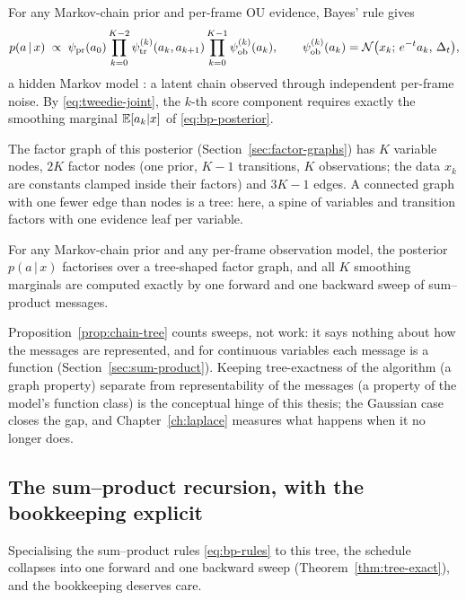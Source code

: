 For any Markov-chain prior and per-frame OU evidence, Bayes' rule gives
\begin{equation}
  p(a \,|\, x) \;\propto\;
  \psi_{\mathrm{pr}}(a_0)
  \prod_{k=0}^{K-2} \psi^{(k)}_{\mathrm{tr}}(a_k, a_{k+1})
  \prod_{k=0}^{K-1} \psi^{(k)}_{\mathrm{ob}}(a_k),
  \qquad
  \psi^{(k)}_{\mathrm{ob}}(a_k) = \mathcal{N}\big(x_k;\, e^{-t}a_k,\, \Delta_t\big),
  \label{eq:bp-posterior}
\end{equation}
a hidden Markov model \citep{rabiner1989tutorial}: a latent chain observed
through independent per-frame noise. By \eqref{eq:tweedie-joint}, the
$k$-th score component requires exactly the smoothing marginal
$\mathbb{E}[a_k | x]$ of \eqref{eq:bp-posterior}.

The factor graph of this posterior (Section~\ref{sec:factor-graphs})
has $K$ variable nodes, $2K$
factor nodes (one prior, $K{-}1$ transitions, $K$ observations; the data
$x_k$ are constants clamped inside their factors) and $3K - 1$ edges. A
connected graph with one fewer edge than nodes is a tree: here, a spine of
variables and transition factors with one evidence leaf per variable.

\begin{proposition}\label{prop:chain-tree}
For any Markov-chain prior and any per-frame observation model, the
posterior $p(a \,|\, x)$ factorises over a tree-shaped factor graph, and
all $K$ smoothing marginals are computed exactly by one forward and one
backward sweep of sum--product messages.
\end{proposition}

Proposition~\ref{prop:chain-tree} counts sweeps, not work: it says
nothing about how the messages are represented, and for continuous
variables each message is a function
(Section~\ref{sec:sum-product}). Keeping tree-exactness of the
algorithm (a graph property) separate from representability of the
messages (a property of the model's function class) is the conceptual
hinge of this thesis; the Gaussian case closes the gap, and
Chapter~\ref{ch:laplace} measures what happens when it no longer does.

\subsection{The sum--product recursion, with the bookkeeping explicit}

Specialising the sum--product rules \eqref{eq:bp-rules} to this tree,
the schedule collapses into one forward and one backward sweep
(Theorem~\ref{thm:tree-exact}), and the bookkeeping deserves care.

